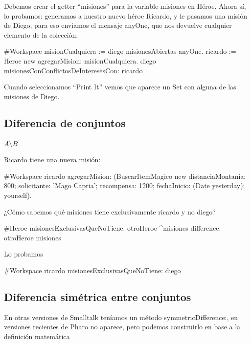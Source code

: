 \documentclass[a4paper,12pt]{book}
\begin{document}
\vspace{\baselineskip}
Debemos crear el getter ``misiones'' para la variable misiones en Héroe. 
Ahora sí, lo probamos: generamos a nuestro nuevo héroe Ricardo, y le pasamos una misión de Diego, 
para eso enviamos el mensaje anyOne, que nos devuelve cualquier elemento de la colección:

\begin{code}
#Workspace
 misionCualquiera := diego misionesAbiertas anyOne.
 ricardo := Heroe new agregarMision: misionCualquiera.
 diego misionesConConflictosDeInteresesCon: ricardo
\end{code}

Cuando seleccionamos ``Print It'' vemos que aparece un Set con alguna de las misiones de Diego.

\subsection{Diferencia de conjuntos}

\begin{mdframed}[style=BoxFrame]
\( A \setminus B \)
\end{mdframed}

Ricardo tiene una nueva misión:

\begin{code}
#Workspace
 ricardo agregarMision: (BuscarItemMagico new 
			distanciaMontania: 800;
			solicitante: 'Mago Capria';
			recompensa: 1200;
			fechaInicio: (Date yesterday);
			yourself).
\end{code}

\vspace{\baselineskip}
¿Cómo sabemos qué misiones tiene exclusivamente ricardo y no diego?

\begin{code}
#Heroe
misionesExclusivasQueNoTiene: otroHeroe
    ^misiones difference: otroHeroe misiones
\end{code}

\vspace{\baselineskip}
Lo probamos

\begin{code}
#Workspace
ricardo misionesExclusivasQueNoTiene: diego
\end{code}

\subsection{Diferencia simétrica entre conjuntos}
En otras versiones de Smalltalk teníamos un método symmetricDifference:, en versiones recientes de Pharo
no aparece, pero podemos construirlo en base a la definición matemática 
\end{document}
